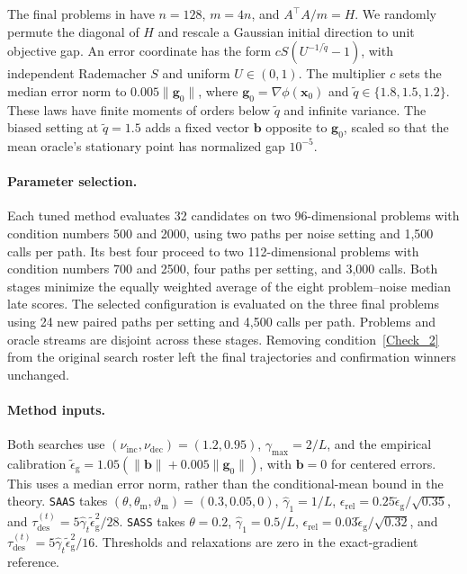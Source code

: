 \documentclass{article}
\begin{document}
The final problems in  have \(n=128\),
\(m=4n\), and \(A^\top A/m=H\). We randomly permute the diagonal of
\(H\) and rescale a Gaussian initial direction to unit objective gap.
An error coordinate has the form \(cS(U^{-1/\widetilde q}-1)\), with
independent Rademacher \(S\) and uniform \(U\in(0,1)\).
The multiplier \(c\) sets the median error norm to
\(0.005\|\bm g_0\|\), where \(\bm g_0=\nabla\phi(\bm x_0)\) and
\(\widetilde q\in\{1.8,1.5,1.2\}\). These laws have finite moments
of orders below \(\widetilde q\) and infinite variance.
The biased setting at \(\widetilde q=1.5\) adds a fixed vector
\(\bm b\) opposite to \(\bm g_0\), scaled so that the mean oracle's
stationary point has normalized gap \(10^{-5}\).

\paragraph{Parameter selection.}
Each tuned method evaluates 32 candidates on two 96-dimensional
problems with condition numbers 500 and 2000, using two paths per
noise setting and 1,500 calls per path. Its best four proceed to two
112-dimensional problems with condition numbers 700 and 2500, four
paths per setting, and 3,000 calls. Both stages minimize the equally
weighted average of the eight problem--noise median late scores.
The selected configuration is evaluated on the three final problems
using 24 new paired paths per setting and 4,500 calls per path.
Problems and oracle streams are disjoint across these stages.
Removing condition~\eqref{Check_2} from the original search roster
left the final trajectories and confirmation winners unchanged.

\paragraph{Method inputs.}
Both searches use \((\nu_{\mathrm{inc}},\nu_{\mathrm{dec}})=(1.2,0.95)\),
\(\gamma_{\max}=2/L\), and the empirical calibration
\(\widetilde\epsilon_{\mathrm g}
=1.05(\|\bm b\|+0.005\|\bm g_0\|)\), with \(\bm b=0\) for centered errors.
This uses a median error norm, rather than the conditional-mean bound
in the theory. \texttt{SAAS} takes
\((\theta,\theta_{\mathrm m},\vartheta_{\mathrm m})=(0.3,0.05,0)\),
\(\hat\gamma_1=1/L\),
\(\epsilon_{\mathrm{rel}}=0.25\widetilde\epsilon_{\mathrm g}/\sqrt{0.35}\), and
\(\tau_{\mathrm{des}}^{(t)}=5\hat\gamma_t\widetilde\epsilon_{\mathrm g}^2/28\).
\texttt{SASS} takes \(\theta=0.2\), \(\hat\gamma_1=0.5/L\),
\(\epsilon_{\mathrm{rel}}=0.03\widetilde\epsilon_{\mathrm g}/\sqrt{0.32}\), and
\(\tau_{\mathrm{des}}^{(t)}=5\hat\gamma_t\widetilde\epsilon_{\mathrm g}^2/16\).
Thresholds and relaxations are zero in the exact-gradient reference.
\end{document}
